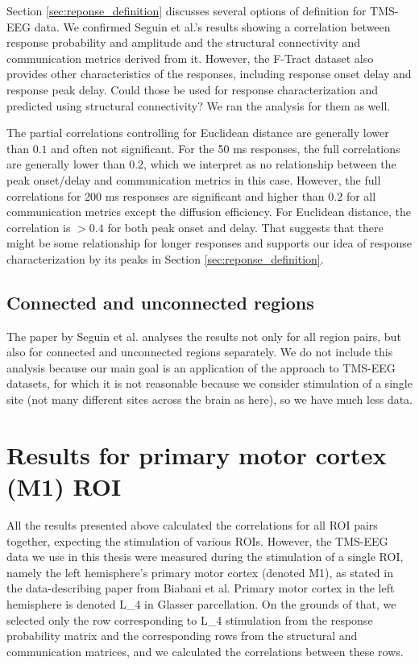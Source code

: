Section \ref{sec:reponse_definition} discusses several options of  definition for TMS-EEG data. We confirmed Seguin et al.'s results showing a correlation between response probability and amplitude and the structural connectivity and communication metrics derived from it. However, the F-Tract dataset also provides other characteristics of the responses, including response onset delay and response peak delay. Could those be used for response characterization and predicted using structural connectivity? We ran the analysis for them as well.

The partial correlations controlling for Euclidean distance are generally lower than $0.1$ and often not significant. For the 50 ms responses, the full correlations are generally lower than $0.2$, which we interpret as no relationship between the peak onset/delay and communication metrics in this case. However, the full correlations for 200 ms responses are significant and higher than $0.2$ for all communication metrics except the diffusion efficiency. For Euclidean distance, the correlation is $>0.4$ for both peak onset and delay. That suggests that there might be some relationship for longer responses and supports our idea of response characterization by its peaks in Section \ref{sec:reponse_definition}.

\subsection{Connected and unconnected regions}

The paper by Seguin et al. \cite{seguin_communication_2023} analyses the results not only for all region pairs, but also for connected and unconnected regions separately. We do not include this analysis because our main goal is an application of the approach to TMS-EEG datasets, for which it is not reasonable because we consider stimulation of a single site (not many different sites across the brain as here), so we have much less data.

\section{Results for primary motor cortex (M1) ROI}\label{sec:ftract_results_per_roi}

All the results presented above calculated the correlations for all ROI pairs together, expecting the stimulation of various ROIs. However, the TMS-EEG data we use in this thesis were measured during the stimulation of a single ROI, namely the left hemisphere's primary motor cortex (denoted M1), as stated in the data-describing paper from Biabani et al. \cite{biabani_characterizing_2019} Primary motor cortex in the left hemisphere is denoted L\_4 in Glasser parcellation. On the grounds of that, we selected only the row corresponding to L\_4 stimulation from the response probability matrix and the corresponding rows from the structural and communication matrices, and we calculated the correlations between these rows. 

